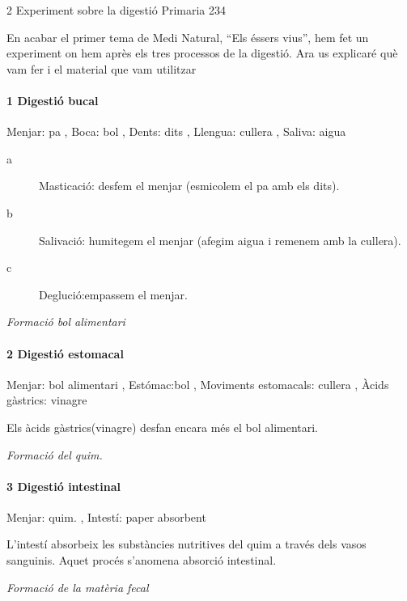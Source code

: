 \begin{news}
{2} %
{Experiment sobre la digestió}
{}
{Primaria}
{234}

En acabar el primer tema de Medi Natural, “Els éssers vius”, hem fet un experiment on hem après els tres processos de la digestió. Ara us explicaré què vam fer i el  material que vam utilitzar
\paragraph{ 1 Digestió bucal}

		Menjar: pa , Boca: bol , Dents: dits ,  Llengua: cullera , Saliva: aigua

	\begin{description}
	\item[a] Masticació: desfem el menjar (esmicolem el pa amb els dits).
	\item[b] Salivació: humitegem el menjar (afegim aigua i remenem amb la cullera).
	\item[c] Deglució:empassem el menjar.
	\end{description}

\emph{Formació bol alimentari}


\paragraph{ 2 Digestió estomacal}

        Menjar: bol alimentari , Estómac:bol , Moviments estomacals: cullera , 
             Àcids gàstrics: vinagre

	Els àcids gàstrics(vinagre) desfan encara més el bol alimentari.

	\emph{Formació del quim.}



\paragraph{ 3 Digestió intestinal}

		Menjar: quim. ,  Intestí: paper absorbent

L’intestí absorbeix les substàncies nutritives del quim a través dels vasos sanguinis. Aquet procés s’anomena absorció intestinal.

	\emph{Formació de la matèria fecal}

\end{news}
